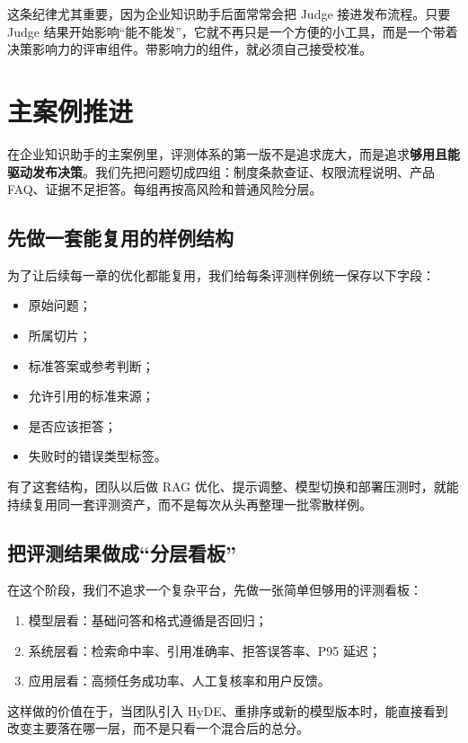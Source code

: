 这条纪律尤其重要，因为企业知识助手后面常常会把 Judge 接进发布流程。只要 Judge 结果开始影响“能不能发”，它就不再只是一个方便的小工具，而是一个带着决策影响力的评审组件。带影响力的组件，就必须自己接受校准。

\section{主案例推进}
在企业知识助手的主案例里，评测体系的第一版不是追求庞大，而是追求\textbf{够用且能驱动发布决策}。我们先把问题切成四组：制度条款查证、权限流程说明、产品 FAQ、证据不足拒答。每组再按高风险和普通风险分层。

\subsection{先做一套能复用的样例结构}
为了让后续每一章的优化都能复用，我们给每条评测样例统一保存以下字段：
\begin{itemize}
  \item 原始问题；
  \item 所属切片；
  \item 标准答案或参考判断；
  \item 允许引用的标准来源；
  \item 是否应该拒答；
  \item 失败时的错误类型标签。
\end{itemize}

有了这套结构，团队以后做 RAG 优化、提示调整、模型切换和部署压测时，就能持续复用同一套评测资产，而不是每次从头再整理一批零散样例。

\subsection{把评测结果做成“分层看板”}
在这个阶段，我们不追求一个复杂平台，先做一张简单但够用的评测看板：
\begin{enumerate}
  \item 模型层看：基础问答和格式遵循是否回归；
  \item 系统层看：检索命中率、引用准确率、拒答误答率、P95 延迟；
  \item 应用层看：高频任务成功率、人工复核率和用户反馈。
\end{enumerate}

这样做的价值在于，当团队引入 HyDE、重排序或新的模型版本时，能直接看到改变主要落在哪一层，而不是只看一个混合后的总分。

